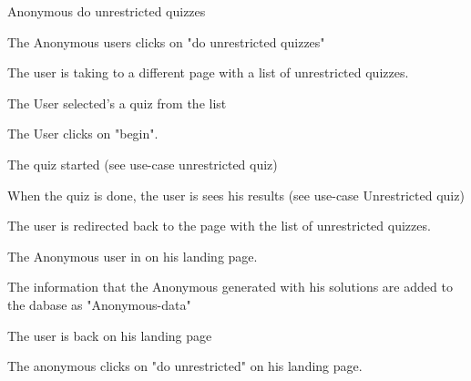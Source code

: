 \begin{uc}{Anonymous do unrestricted quizzes}

    \begin{uc-mss}
    	\item The Anonymous users clicks on "do unrestricted quizzes"
    	\item The user is taking to a different page with a list of unrestricted quizzes.
    	\item The User selected's a quiz from the list
    	\item The User clicks on "begin".
    	\item The quiz started (see use-case unrestricted quiz)
    	\item When the quiz is done, the user is sees his results (see use-case Unrestricted quiz)
    	\item The user is redirected back to the page with the list of unrestricted quizzes.
    \end{uc-mss}

    \begin{uc-pre}
        \item The Anonymous user in on his landing page.
    \end{uc-pre}

    \begin{uc-post}
        \item The information that the Anonymous generated with his solutions are added to the dabase as "Anonymous-data"
        \item The user is back on his landing page
    \end{uc-post}

    \begin{uc-trig}
        \item The anonymous clicks on "do unrestricted" on his landing page.
    \end{uc-trig}

\end{uc}